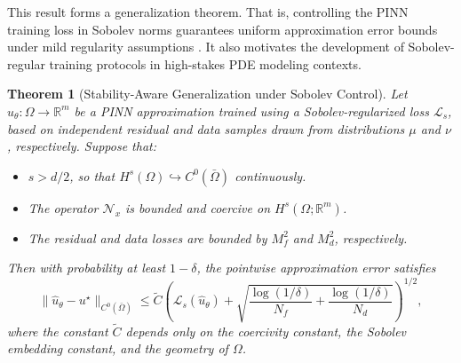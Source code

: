 \documentclass[11pt, a4paper]{article}
\newtheorem{thm}{Theorem}
\begin{document}
This result forms a generalization theorem. That is, controlling the PINN training loss in Sobolev norms guarantees uniform approximation error bounds under mild regularity assumptions \cite{karniadakis2021physics}. It also motivates the development of Sobolev-regular training protocols in high-stakes PDE modeling contexts.


\begin{thm}[Stability-Aware Generalization under Sobolev Control]
Let $\hat{u}_\theta \colon \Omega \to \mathbb{R}^m$ be a PINN approximation trained using a Sobolev-regularized loss $\mathcal{L}_s$, based on independent residual and data samples drawn from distributions $\mu$ and $\nu$, respectively. Suppose that:
\begin{itemize}
  \item[(i)] $s > d/2$, so that $H^s(\Omega) \hookrightarrow C^0(\bar{\Omega})$ continuously.
  \item[(ii)] The operator $\mathcal{N}_x$ is bounded and coercive on $H^s(\Omega; \mathbb{R}^m)$.
  \item[(iii)] The residual and data losses are bounded by $M_f^2$ and $M_d^2$, respectively.
\end{itemize}
Then with probability at least $1 - \delta$, the pointwise approximation error satisfies
\[
\| \hat{u}_\theta - u^\star \|_{C^0(\bar{\Omega})} \leq \tilde{C} \left( \mathcal{L}_s(\hat{u}_\theta) + \sqrt{ \frac{\log(1/\delta)}{N_f} + \frac{\log(1/\delta)}{N_d} } \right)^{1/2},
\]
where the constant $\tilde{C}$ depends only on the coercivity constant, the Sobolev embedding constant, and the geometry of $\Omega$.
\end{thm}
\end{document}
